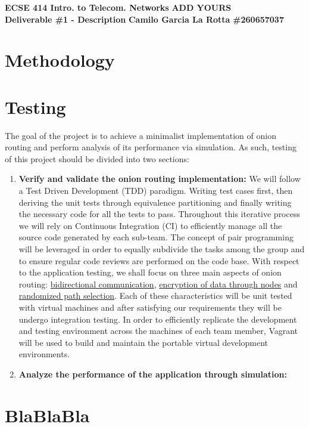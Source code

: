 \documentclass{article}
\begin{document}
\noindent
\large \textbf{ECSE 414 Intro. to Telecom. Networks} \hfill \textbf{ADD YOURS} \\
\large \textbf{Deliverable \#1 - Description} \hfill \textbf{Camilo Garcia La Rotta} \textbf{\#260657037} \\

\section*{Methodology}

\section*{Testing}
The goal of the project is to achieve a minimalist implementation of onion routing and perform analysis of its performance via simulation. As such, testing of this project should be divided into two sections:
\begin{enumerate}
    \item \textbf{Verify and validate the onion routing implementation:} We will follow a Test Driven Development (TDD) paradigm. Writing test cases first, then deriving the unit tests through equivalence partitioning and finally writing the necessary code for all the tests to pass. Throughout this iterative process we will rely on Continuous Integration (CI) to efficiently manage all the source code generated by each sub-team. The concept of pair programming will be leveraged in order to equally subdivide the tasks among the group and to ensure regular code reviews are performed on the code base. With respect to the application testing, we shall focus on three main aspects of onion routing: \underline{bidirectional communication}, \underline{encryption of data through nodes} and \underline{randomized path selection}. Each of these characteristics will be unit tested with virtual machines and after satisfying our requirements they will be undergo integration testing. In order to efficiently replicate the development and testing environment across the machines of each team member, Vagrant will be used to build and maintain the portable virtual development environments.
    \item \textbf{Analyze the performance of the application through simulation:}
    

\end{enumerate}


\section*{BlaBlaBla}
\end{document}
